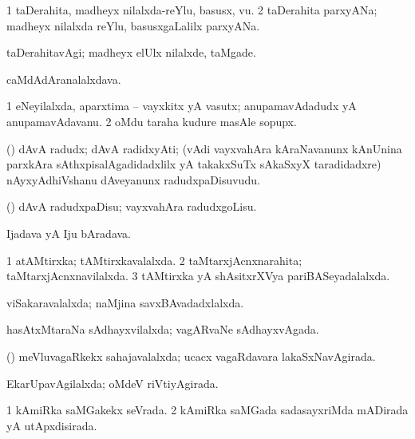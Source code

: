 \bentry
{}
\gl{\nA}
\bmng
\bnum
\num{1} taDerahita, madheyx nilalxda-reYlu, basusx, \mo vu. 
\num{2} taDerahita parxyANa; madheyx nilalxda reYlu, basusxgaLalilx parxyANa. 
\enum
\emng
\eentry

\bentry
{}
\gl{\kirxvi}
\bmng
taDerahitavAgi; madheyx elUlx nilalxde, taMgade. 
\emng
\eentry

\bentry
{}
\gl{\nA}
\bmng
caMdAdAranalalxdava. 
\emng
\eentry

\bentry
{}
\gl{\nA}
\bmng
\bnum
\num{1} eNeyilalxda, aparxtima -- vayxkitx yA vasutx; anupamavAdadudx yA anupamavAdavanu. 
\num{2} oMdu taraha kudure masAle sopupx. 
\enum
\emng
\eentry

\bentry
{}
\gl{\nA}
\bmng
(\nAyxshA) dAvA radudx; dAvA radidxyAti; (vAdi vayxvahAra kAraNavanunx kAnUnina parxkAra sAthxpisalAgadidadxlilx yA takakxSuTx sAkaSxyX taradidadxre) nAyxyAdhiVshanu dAveyanunx radudxpaDisuvudu. 
\emng
\eentry

\bentry
{}
\gl{\sakirx}
\bmng
(\nAyxshA) dAvA radudxpaDisu; vayxvahAra radudxgoLisu. 
\emng
\eentry

\bentry
{}
\gl{\nA}
\bmng
Ijadava yA Iju bAradava. 
\emng
\eentry

\bentry
{}
\gl{\gu}
\bmng
\bnum
\num{1} atAMtirxka; tAMtirxkavalalxda. 
\num{2} taMtarxjAcnxnarahita; taMtarxjAcnxnavilalxda. 
\num{3} tAMtirxka yA shAsitxrXVya pariBASeyadalalxda. 
\enum
\emng
\eentry

\bentry
{}
\gl{\gu}
\bmng
viSakaravalalxda; naMjina savxBAvadadxlalxda. 
\emng
\eentry

\bentry
{}
\gl{\gu}
\bmng
hasAtxMtaraNa sAdhayxvilalxda; vagARvaNe sAdhayxvAgada. 
\emng
\eentry

\bentry
{}
\gl{\gu}
\bmng
(\AmA) meVluvagaRkekx sahajavalalxda; ucacx vagaRdavara lakaSxNavAgirada. 
\emng
\eentry

\bentry
{}
\gl{\gu}
\bmng
EkarUpavAgilalxda; oMdeV riVtiyAgirada. 
\emng
\eentry

\bentry
{}
\gl{\gu}
\bmng
\bnum
\num{1} kAmiRka saMGakekx seVrada. 
\num{2} kAmiRka saMGada sadasayxriMda mADirada yA utApxdisirada. 
\enum
\emng
\eentry

